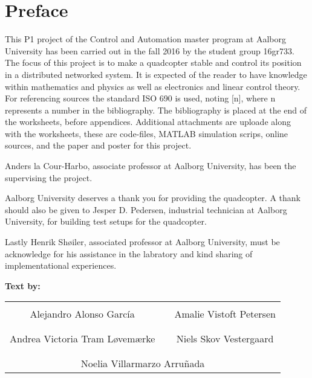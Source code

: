 
\chapter*{Preface}
This P1 project of the Control and Automation master program at Aalborg University has been carried out in the fall 2016 by the student group 16gr733. 
The focus of this project is to make a quadcopter stable and control its position in a distributed networked system. 
It is expected of the reader to have knowledge within mathematics and physics as well as electronics and linear control theory.
For referencing sources the standard ISO 690 is used, noting [n], where n represents a number in the bibliography. The bibliography is placed at the end of the worksheets, before appendices. Additional attachments are uploade along with the worksheets, these are code-files, MATLAB simulation scrips, online sources, and the paper and poster for this project.   

Anders la Cour-Harbo, associate professor at Aalborg University, has been the supervising the project. 

Aalborg University deserves a thank you for providing the quadcopter. A thank should also be given to Jesper D. Pedersen, industrial technician at Aalborg University, for building test setups for the quadcopter. 

Lastly Henrik Shøiler, associated professor at Aalborg University, must be acknowledge for his assistance in the labratory and kind sharing of implementational experiences.

\textbf{Text by:}\\
\vspace{-5pt}
\begin{table}[H]
	\centering
		\begin{tabular}{c c c}
			\underline{\phantom{JAERJAERJAERJAERGO}} & \phantom{cookies} & \underline{\phantom{JAERJAERJAERJAERGO}} \\
			Alejandro Alonso García			& \phantom{cookies} & Amalie Vistoft Petersen		\\
			&&\\
			\underline{\phantom{JAERJAERJAERJAERGO}} & \phantom{cookies} & \underline{\phantom{JAERJAERJAERJAERGO}} \\
			Andrea Victoria Tram Løvemærke			& \phantom{cookies} & Niels Skov Vestergaard		\\
			&&\\
	    \multicolumn{3}{c}{\underline{\phantom{JAERJAERJAERJAERGO}}}\\
	    \multicolumn{3}{c}{Noelia Villarmarzo Arruñada}\\				
		\end{tabular}
\end{table}

\pagebreak
\restoregeometry